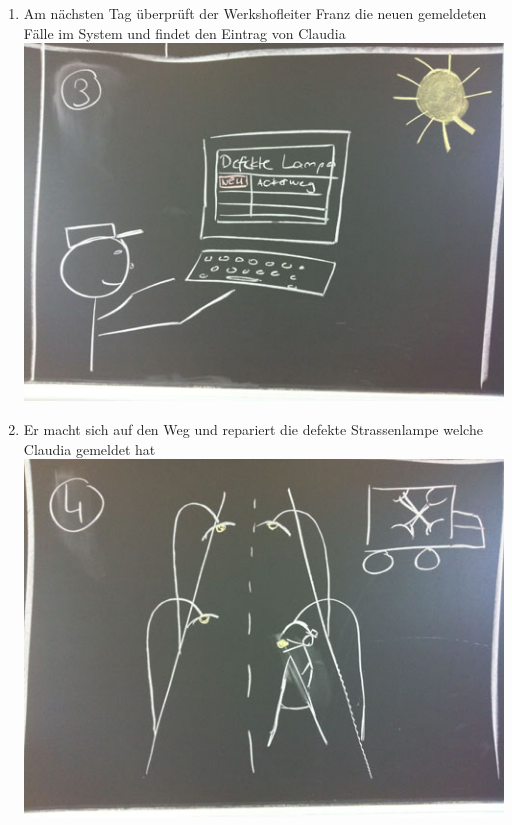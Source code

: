 \begin{enumerate}
\item Am nächsten Tag überprüft der Werkshofleiter Franz die neuen gemeldeten Fälle im System und findet den Eintrag von Claudia \\ \includegraphics[scale=0.4]{images/usecase2-fixmystreet/storyboard/fixmystreet-storyboard-3.jpg}
\item Er macht sich auf den Weg und repariert die defekte Strassenlampe welche Claudia gemeldet hat \\ \includegraphics[scale=0.4]{images/usecase2-fixmystreet/storyboard/fixmystreet-storyboard-4.jpg}

\end{enumerate}
